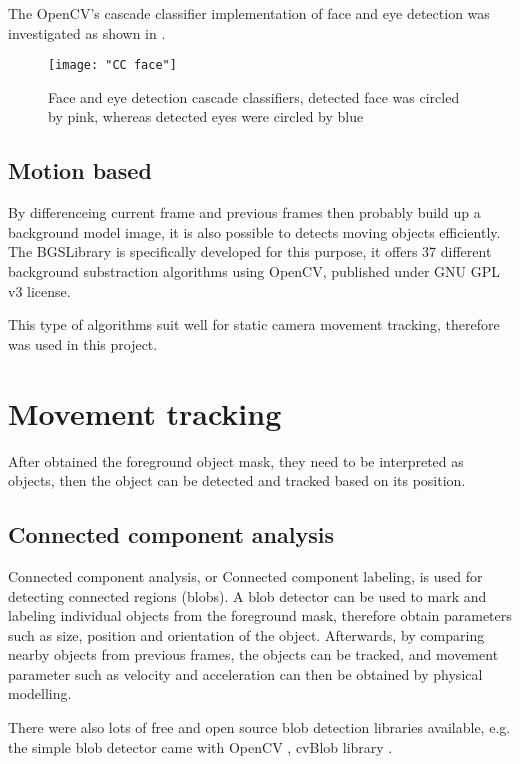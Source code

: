 The OpenCV's cascade classifier implementation \cite{opencv:cc} of face and eye detection was investigated as shown in .

\begin{figure}[H]
  \centering
  \texttt{[image: "CC face"]}
  \caption{Face and eye detection cascade classifiers, detected face was circled by pink, whereas detected eyes were circled by blue}
  \label{Figure:cc_face}
\end{figure}

\subsection{Motion based}

By differenceing current frame and previous frames then probably build up a background model image, it is also possible to detects moving objects efficiently. The BGSLibrary \cite{bgslibrary} is specifically developed for this purpose, it offers 37 different background substraction algorithms using OpenCV, published under GNU GPL v3 license.

This type of algorithms suit well for static camera movement tracking, therefore was used in this project.

\section{Movement tracking}

After obtained the foreground object mask, they need to be interpreted as objects, then the object can be detected and tracked based on its position.

\subsection{Connected component analysis} \label{blob}

Connected component analysis, or Connected component labeling, is used for detecting connected regions (blobs). A blob detector can be used to mark and labeling individual objects from the foreground mask, therefore obtain parameters such as size, position and orientation of the object. Afterwards, by comparing nearby objects from previous frames, the objects can be tracked, and movement parameter such as velocity and acceleration can then be obtained by physical modelling.

There were also lots of free and open source blob detection libraries available, e.g. the simple blob detector came with OpenCV \cite{opencv:blob}, cvBlob library \cite{cvblob}.

